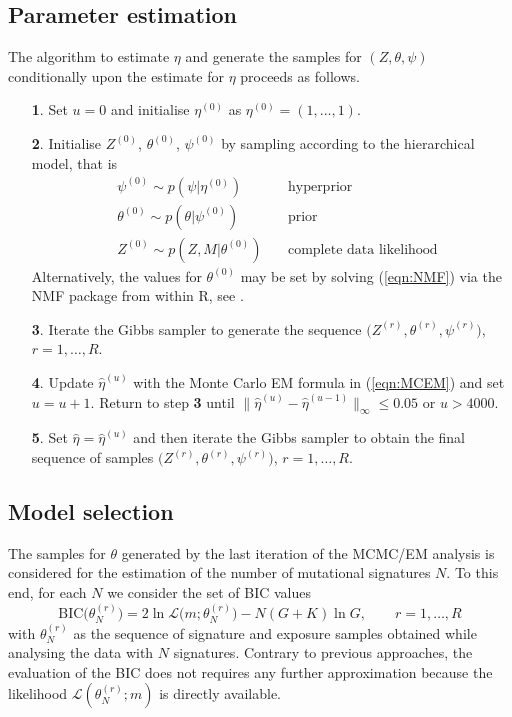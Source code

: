 \documentclass{bioinfo}
\begin{document}
\subsection{Parameter estimation}
The algorithm to estimate $\eta$ and generate the samples for $(Z,
\theta, \psi)$ conditionally upon the estimate for $\eta$ proceeds as 
follows. 
\begin{enumerate}
\item[\textbf{1}.] Set $u = 0$ and initialise $\eta^{(0)}$ as
  $\eta^{(0)} = (1, \ldots, 1)$.
\item[\textbf{2}.] Initialise $Z^{(0)}$, $\theta^{(0)}$, $\psi^{(0)}$
  by sampling according to the hierarchical model, that is
  \begin{align*}
     &\psi^{(0)} \sim p(\psi | \eta^{(0)}) &\ 
        &\text{hyperprior}\\ 
     &\theta^{(0)} \sim p(\theta | \psi^{(0)}) &\ 
        &\text{prior}\\
     &Z^{(0)} \sim p(Z, M|\theta^{(0)}) &\ 
        &\text{complete data likelihood}
  \end{align*}
  Alternatively, the values for $\theta^{(0)}$ may be set by solving 
  (\ref{eqn:NMF}) via the NMF package from within R, see
  \citealp{GS}.
\item[\textbf{3}.] Iterate the Gibbs sampler to generate the sequence
 $\big(Z^{(r)}, \theta^{(r)}, \psi^{(r)}\big)$, $r = 1, \ldots, R$.
\item[\textbf{4}.] Update $\hat\eta^{(u)}$ with the Monte Carlo EM
formula in (\ref{eqn:MCEM}) and set $u = u+1$. Return to step
\textbf{3} until $\big\|\hat\eta^{(u)} - \hat\eta^{(u-1)}\big\|_\infty  
\leqslant 0.05$ or $u > 4000$. 
\item[\textbf{5}.] Set $\hat\eta = \hat\eta^{(u)}$ and then iterate
  the Gibbs sampler to obtain the final sequence of samples
  $\big(Z^{(r)}, \theta^{(r)}, \psi^{(r)}\big)$, $r=1, \ldots,
  R$. 
\end{enumerate}

\subsection{Model selection}
The samples for $\theta$ generated by the last iteration of the
MCMC/EM analysis is considered for the estimation of the number 
of mutational signatures $N$. To this end, for each $N$ we consider
the set of BIC values
\[
  \text{BIC}\big(\theta^{(r)}_N\big) = 2\ln\mathcal L\big(m;
    \theta^{(r)}_{N}\big) - N(G+K)\ln G, \qquad r =1, \ldots,
    R
\]
with $\theta^{(r)}_N$ as the sequence of signature and exposure 
samples obtained while analysing the  data with $N$
signatures. Contrary to previous approaches, the evaluation of the BIC
does not requires any further approximation because the likelihood
$\mathcal L(\theta^{(r)}_N; m)$ is directly available.
\end{document}
